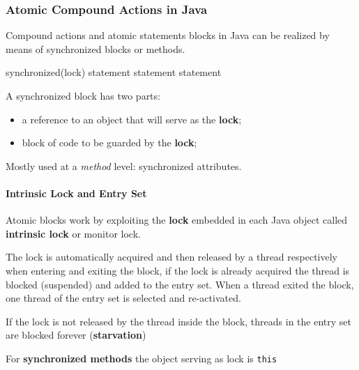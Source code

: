 \documentclass{article}
\begin{document}
\subsubsection{Atomic Compound Actions in Java}\label{sub:atomic_compound_actions_in_java} %
Compound actions and atomic statements blocks in Java can be realized by means of synchronized blocks or methods.
\begin{codeblock}[java]{}
    synchronized(lock) {
        statement
        statement
        statement
    }
\end{codeblock}
A synchronized block has two parts:
\begin{itemize}
    \item a reference to an object that will serve as the \textbf{lock};
    \item block of code to be guarded by the \textbf{lock};
\end{itemize}
\begin{note}
    Mostly used at a \textit{method} level: synchronized attributes.
\end{note}
\paragraph{Intrinsic Lock and Entry Set}\label{par:intrinsic_lock_and_entry_set} %
Atomic blocks work by exploiting the \textbf{lock} embedded in each Java object called \textbf{intrinsic lock} or monitor lock.
\begin{note}
\end{note}
The lock is automatically acquired and then released by a thread respectively when entering and exiting the block, if the lock is already acquired the thread is blocked (suspended) and added to the entry set.
When a thread exited the block, one thread of the entry set is selected and re-activated.
\begin{warning}
    If the lock is not released by the thread inside the block, threads in the entry set are blocked forever (\textbf{starvation})
\end{warning}
\begin{note}
    For \textbf{synchronized methods} the object serving as lock is \texttt{this}
\end{note}
%
\end{document}
